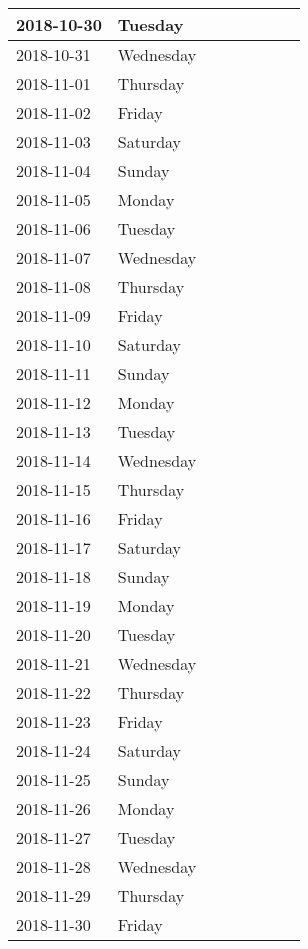 \documentclass[10pt,a4paper]{article}
\begin{document}
\begin{longtable}{| p{} p{} | p{} | p{} | p{} | p{} | p{} | p{} |}
2018-10-30	&Tuesday	& & & & & &\\ \hline
2018-10-31	&Wednesday	& & & & & &\\ \hline
2018-11-01	&Thursday	& & & & & &\\ \hline
2018-11-02	&Friday		& & & & & &\\ \hline
2018-11-03	&Saturday	& & & & & &\\ \hline
2018-11-04	&Sunday		& & & & & &\\ \hline
2018-11-05	&Monday		& & & & & &\\ \hline
2018-11-06	&Tuesday	& & & & & &\\ \hline
2018-11-07	&Wednesday	& & & & & &\\ \hline
2018-11-08	&Thursday	& & & & & &\\ \hline
2018-11-09	&Friday		& & & & & &\\ \hline
2018-11-10	&Saturday	& & & & & &\\ \hline
2018-11-11	&Sunday		& & & & & &\\ \hline
2018-11-12	&Monday		& & & & & &\\ \hline
2018-11-13	&Tuesday	& & & & & &\\ \hline
2018-11-14	&Wednesday	& & & & & &\\ \hline
2018-11-15	&Thursday	& & & & & &\\ \hline
2018-11-16	&Friday		& & & & & &\\ \hline
2018-11-17	&Saturday	& & & & & &\\ \hline
2018-11-18	&Sunday		& & & & & &\\ \hline
2018-11-19	&Monday		& & & & & &\\ \hline
2018-11-20	&Tuesday	& & & & & &\\ \hline
2018-11-21	&Wednesday	& & & & & &\\ \hline
2018-11-22	&Thursday	& & & & & &\\ \hline
2018-11-23	&Friday		& & & & & &\\ \hline
2018-11-24	&Saturday	& & & & & &\\ \hline
2018-11-25	&Sunday		& & & & & &\\ \hline
2018-11-26	&Monday		& & & & & &\\ \hline
2018-11-27	&Tuesday	& & & & & &\\ \hline
2018-11-28	&Wednesday	& & & & & &\\ \hline
2018-11-29	&Thursday	& & & & & &\\ \hline
2018-11-30	&Friday		& & & & & &\\ \hline

\end{longtable}
\end{document}
